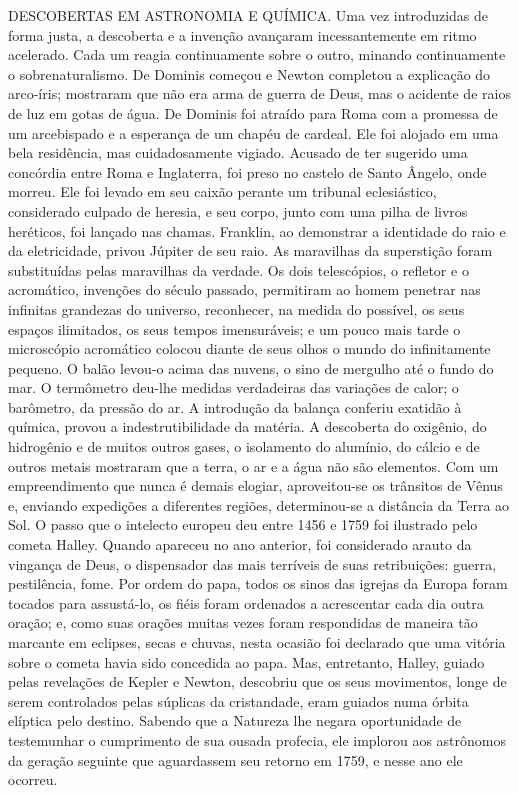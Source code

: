\documentclass[11pt,a5paper,twoside,openany]{book}
\begin{document}
DESCOBERTAS EM ASTRONOMIA E QUÍMICA. Uma vez introduzidas de forma justa, a descoberta e a invenção avançaram incessantemente em ritmo acelerado. Cada um reagia continuamente sobre o outro, minando continuamente o sobrenaturalismo. De Dominis começou e Newton completou a explicação do arco-íris; mostraram que não era arma de guerra de Deus, mas o acidente de raios de luz em gotas de água. De Dominis foi atraído para Roma com a promessa de um arcebispado e a esperança de um chapéu de cardeal. Ele foi alojado em uma bela residência, mas cuidadosamente vigiado. Acusado de ter sugerido uma concórdia entre Roma e Inglaterra, foi preso no castelo de Santo Ângelo, onde morreu. Ele foi levado em seu caixão perante um tribunal eclesiástico, considerado culpado de heresia, e seu corpo, junto com uma pilha de livros heréticos, foi lançado nas chamas. Franklin, ao demonstrar a identidade do raio e da eletricidade, privou Júpiter de seu raio. As maravilhas da superstição foram substituídas pelas maravilhas da verdade. Os dois telescópios, o refletor e o acromático, invenções do século passado, permitiram ao homem penetrar nas infinitas grandezas do universo, reconhecer, na medida do possível, os seus espaços ilimitados, os seus tempos imensuráveis; e um pouco mais tarde o microscópio acromático colocou diante de seus olhos o mundo do infinitamente pequeno. O balão levou-o acima das nuvens, o sino de mergulho até o fundo do mar. O termômetro deu-lhe medidas verdadeiras das variações de calor; o barômetro, da pressão do ar. A introdução da balança conferiu exatidão à química, provou a indestrutibilidade da matéria. A descoberta do oxigênio, do hidrogênio e de muitos outros gases, o isolamento do alumínio, do cálcio e de outros metais mostraram que a terra, o ar e a água não são elementos. Com um empreendimento que nunca é demais elogiar, aproveitou-se os trânsitos de Vênus e, enviando expedições a diferentes regiões, determinou-se a distância da Terra ao Sol. O passo que o intelecto europeu deu entre 1456 e 1759 foi ilustrado pelo cometa Halley. Quando apareceu no ano anterior, foi considerado arauto da vingança de Deus, o dispensador das mais terríveis de suas retribuições: guerra, pestilência, fome. Por ordem do papa, todos os sinos das igrejas da Europa foram tocados para assustá-lo, os fiéis foram ordenados a acrescentar cada dia outra oração; e, como suas orações muitas vezes foram respondidas de maneira tão marcante em eclipses, secas e chuvas, nesta ocasião foi declarado que uma vitória sobre o cometa havia sido concedida ao papa. Mas, entretanto, Halley, guiado pelas revelações de Kepler e Newton, descobriu que os seus movimentos, longe de serem controlados pelas súplicas da cristandade, eram guiados numa órbita elíptica pelo destino. Sabendo que a Natureza lhe negara oportunidade de testemunhar o cumprimento de sua ousada profecia, ele implorou aos astrônomos da geração seguinte que aguardassem seu retorno em 1759, e nesse ano ele ocorreu.
\end{document}
